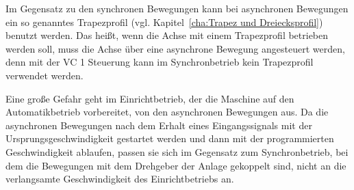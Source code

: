 Im Gegensatz zu den synchronen Bewegungen kann bei asynchronen Bewegungen ein so genanntes Trapezprofil (vgl. Kapitel~\ref{cha:Trapez und Dreiecksprofil}) benutzt werden. Das heißt, wenn die Achse mit einem Trapezprofil betrieben werden soll, muss die Achse über eine asynchrone Bewegung angesteuert werden, denn mit der VC 1 Steuerung kann im Synchronbetrieb kein Trapezprofil verwendet werden.


Eine große Gefahr geht im Einrichtbetrieb, der die Maschine auf den Automatikbetrieb vorbereitet, von den asynchronen Bewegungen aus. Da die asynchronen Bewegungen nach dem Erhalt eines Eingangssignals mit der Ursprungsgeschwindigkeit gestartet werden und dann mit der programmierten Geschwindigkeit ablaufen, passen sie sich im Gegensatz zum Synchronbetrieb, bei dem die Bewegungen mit dem Drehgeber der Anlage gekoppelt sind, nicht an die verlangsamte Geschwindigkeit des Einrichtbetriebs an.
